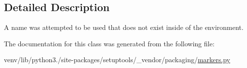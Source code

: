\subsection{Detailed Description}
\begin{DoxyVerb}A name was attempted to be used that does not exist inside of the
environment.
\end{DoxyVerb}
 

The documentation for this class was generated from the following file\+:\begin{DoxyCompactItemize}
\item 
venv/lib/python3./site-\/packages/setuptools/\+\_\+vendor/packaging/\hyperlink{setuptools_2__vendor_2packaging_2markers_8py}{markers.\+py}\end{DoxyCompactItemize}
